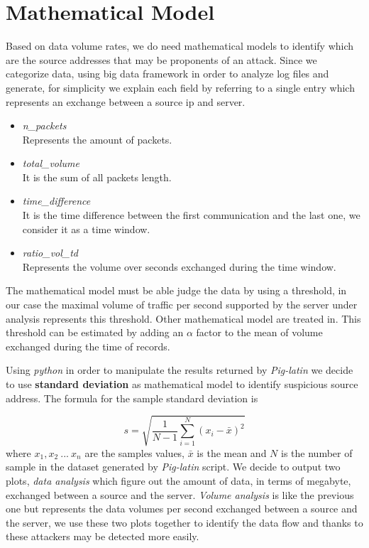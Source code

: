 \section{Mathematical Model}
Based on data volume rates, we do need mathematical models to identify which are the source addresses that may be proponents of an attack. Since we categorize data, using big data framework in order to analyze log files and generate, for simplicity we explain each field by referring to a single entry which represents an exchange between a source ip and server.

\begin{itemize}
	\item \textit{n\_packets} \\ Represents the amount of packets.
	\item \textit{total\_volume} \\ It is the sum of all packets length.
	\item \textit{time\_difference} \\ It is the time difference between the first communication and the last one, we consider it as a time window.
	\item \textit{ratio\_vol\_td} \\ Represents the volume over seconds exchanged during the time window.
\end{itemize}

The mathematical model must be able judge the data by using a threshold, in our case the maximal volume of traffic per second supported by the server under analysis represents this threshold. Other mathematical model are treated in\cite{detection_by_path_analaysis}. 
This threshold can be estimated by adding an $\alpha$ factor to the mean of volume exchanged during the time of records.

Using \textit{python} in order to manipulate the results returned by \textit{Pig-latin} we decide to use \textbf{standard deviation} as mathematical model to identify suspicious source address.
The formula for the sample standard deviation is

\begin{equation}
\label{eq:standard_dev}
	s = \sqrt{\frac{1}{N-1}\sum_{i=1}^N(x_i - \bar{x})^2}
\end{equation}
where $x_1, x_2\ ...\ x_n$ are the samples values, $\bar{x}$ is the mean and $N$ is the number of sample in the dataset generated by \textit{Pig-latin} script. We decide to output two plots, \textit{data analysis} which figure out the amount of data, in terms of megabyte, exchanged between a source and the server. \textit{Volume analysis} is like the previous one but represents the data volumes per second exchanged between a source and the server, we use these two plots together to identify the data flow and thanks to these attackers may be detected more easily.
